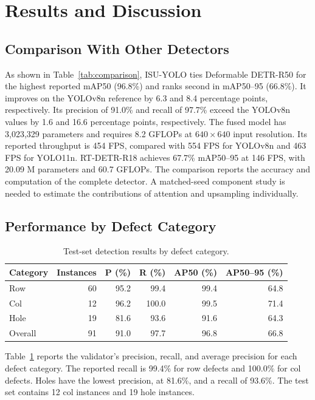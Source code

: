 \documentclass[lettersize,journal]{IEEEtran}
\begin{document}
\section{Results and Discussion}
\label{sec:results}
\subsection{Comparison With Other Detectors}
As shown in Table~\ref{tab:comparison}, ISU-YOLO ties Deformable DETR-R50 for the highest reported mAP50 (96.8\%) and ranks second in mAP50--95 (66.8\%). It improves on the YOLOv8n reference by 6.3 and 8.4 percentage points, respectively. Its precision of 91.0\% and recall of 97.7\% exceed the YOLOv8n values by 1.6 and 16.6 percentage points, respectively. The fused model has 3,023,329 parameters and requires 8.2 GFLOPs at \(640\times640\) input resolution. Its reported throughput is 454 FPS, compared with 554 FPS for YOLOv8n and 463 FPS for YOLO11n. RT-DETR-R18 achieves 67.7\% mAP50--95 at 146 FPS, with 20.09 M parameters and 60.7 GFLOPs. The comparison reports the accuracy and computation of the complete detector. A matched-seed component study is needed to estimate the contributions of attention and upsampling individually.

\subsection{Performance by Defect Category}
\label{sec:category-results}
\begin{table}[!htbp]
\caption{Test-set detection results by defect category.}
\label{tab:category-results}
\centering
\footnotesize
\setlength{\tabcolsep}{2pt}
\begin{tabular*}{\columnwidth}{@{\extracolsep{\fill}}lrrrrr@{}}
\toprule
Category & Instances & P (\%) & R (\%) & AP50 (\%) & AP50--95 (\%) \\
\midrule
Row & 60 & 95.2 & 99.4 & 99.4 & 64.8 \\
Col & 12 & 96.2 & 100.0 & 99.5 & 71.4 \\
Hole & 19 & 81.6 & 93.6 & 91.6 & 64.3 \\
\midrule
Overall & 91 & 91.0 & 97.7 & 96.8 & 66.8 \\
\bottomrule
\end{tabular*}
\end{table}

Table~\ref{tab:category-results} reports the validator's precision, recall, and average precision for each defect category. The reported recall is 99.4\% for row defects and 100.0\% for col defects. Holes have the lowest precision, at 81.6\%, and a recall of 93.6\%. The test set contains 12 col instances and 19 hole instances.
\end{document}
